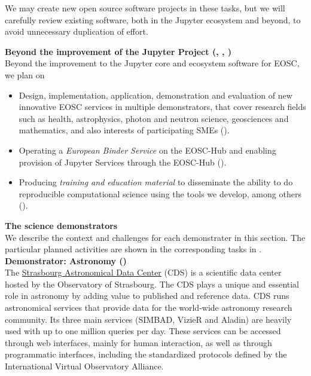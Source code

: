 We may create new open source software projects in these tasks,
but we will carefully review existing software, both in the
Jupyter ecosystem and beyond, to avoid unnecessary duplication of effort.

\medskip\noindent\textbf{Beyond the improvement of the Jupyter Project
  (, , )}\\
Beyond the improvement to the Jupyter core and ecosystem software for EOSC, we plan on
\begin{itemize}
\item Design, implementation, application, demonstration and
  evaluation of new innovative EOSC services
  in multiple demonstrators, that cover research fields such as
  health, astrophysics, photon and neutron science, geosciences and
  mathematics, and also interests of participating SMEs ().
\item Operating a \emph{European Binder Service} on the EOSC-Hub and
  enabling provision of Jupyter Services through the EOSC-Hub ().
\item Producing \emph{training and education material} to disseminate
  the ability to do reproducible computational science using the tools
  we develop, among others ().
\end{itemize}

\medskip
\noindent
\textbf{The science
  demonstrators}\label{sec:science-demonstrators-in-concept}\\

We describe the context and challenges for each demonstrater in this
section. The particular planned activities are shown in the
corresponding tasks in .\\

\noindent\textbf{Demonstrator: Astronomy ()}\label{sec:concept-demonstrator-astronomy}\\
  The \href{http://cdsweb.u-strasbg.fr/}{Strasbourg Astronomical Data Center} (CDS) is a scientific data
  center hosted by the Observatory of Strasbourg. The CDS plays a unique and
  essential role in astronomy by adding value to published and reference data.
  CDS runs astronomical services that
  provide data for the world-wide astronomy research community. Its three main
  services (SIMBAD, VizieR and Aladin) are heavily used with up to one million
  queries per day.  These services can be accessed through web interfaces, mainly
  for human interaction, as well as through programmatic interfaces, including
  the standardized protocols defined by the International Virtual Observatory
  Alliance.

